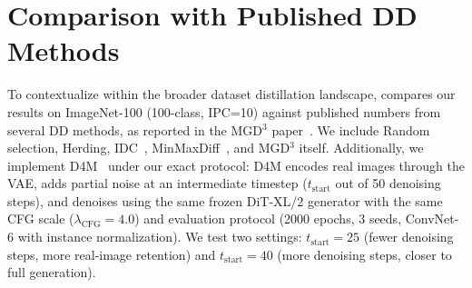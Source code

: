 \section{Comparison with Published DD Methods}
\label{sec:dd-baselines}

To contextualize \cags{} within the broader dataset distillation landscape,  compares our results on ImageNet-100 (100-class, IPC=10) against published numbers from several DD methods, as reported in the MGD$^3$ paper~\cite{chansantiago2025modeguided}. We include Random selection, Herding, IDC~\cite{kim2022dataset}, MinMaxDiff~\cite{fan2025generative}, and MGD$^3$ itself. Additionally, we implement D4M~\cite{su2024dataset} under our exact protocol: D4M encodes real images through the VAE, adds partial noise at an intermediate timestep ($t_{\text{start}}$ out of 50 denoising steps), and denoises using the same frozen DiT-XL/2 generator with the same CFG scale ($\lambda_{\text{CFG}} = 4.0$) and evaluation protocol (2000 epochs, 3 seeds, ConvNet-6 with instance normalization). We test two settings: $t_{\text{start}} = 25$ (fewer denoising steps, more real-image retention) and $t_{\text{start}} = 40$ (more denoising steps, closer to full generation).

